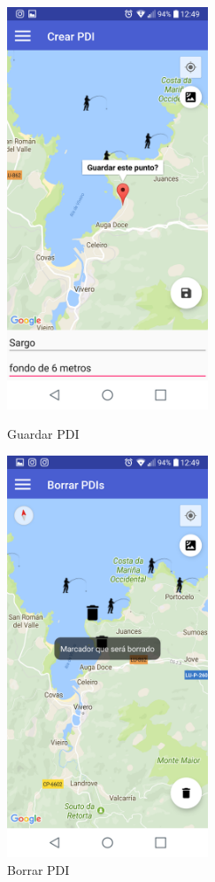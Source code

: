 \begin{figure}[htbp]
\begin{minipage}[b]{0.5\linewidth} %
\centering
\includegraphics[width=6cm]{capturamovil/pdiguardar.png}

\caption{Guardar PDI}
\label{fig:pdiguardar}
\end{minipage}
\hspace{0.5cm} %
\begin{minipage}[b]{0.5\linewidth}
\centering
\includegraphics[width=6cm]{capturamovil/pdiborrar.png}

\caption{Borrar PDI }
\label{fig:pdiborrar}
\end{minipage}
\end{figure}



